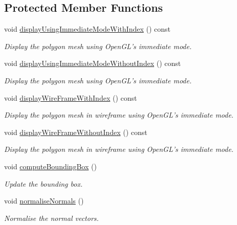 \subsection*{Protected Member Functions}
\begin{DoxyCompactItemize}
\item 
void \hyperlink{class_graphics_1_1_triangle_mesh_a9efdf4756ab73014ae197b1b5979e108}{displayUsingImmediateModeWithIndex} () const 
\begin{DoxyCompactList}\small\item\em Display the polygon mesh using OpenGL's immediate mode. \end{DoxyCompactList}\item 
void \hyperlink{class_graphics_1_1_triangle_mesh_a4843779d6f90b2889de7ba8c346d8321}{displayUsingImmediateModeWithoutIndex} () const 
\begin{DoxyCompactList}\small\item\em Display the polygon mesh using OpenGL's immediate mode. \end{DoxyCompactList}\item 
void \hyperlink{class_graphics_1_1_triangle_mesh_a01836381cac26a3491d919a3bf1ab92c}{displayWireFrameWithIndex} () const 
\begin{DoxyCompactList}\small\item\em Display the polygon mesh in wireframe using OpenGL's immediate mode. \end{DoxyCompactList}\item 
void \hyperlink{class_graphics_1_1_triangle_mesh_a155ce509ff70efecb84d24e22919b9f0}{displayWireFrameWithoutIndex} () const 
\begin{DoxyCompactList}\small\item\em Display the polygon mesh in wireframe using OpenGL's immediate mode. \end{DoxyCompactList}\item 
void \hyperlink{class_graphics_1_1_triangle_mesh_a06709382a9e87d0758fa3bda0268a805}{computeBoundingBox} ()
\begin{DoxyCompactList}\small\item\em Update the bounding box. \end{DoxyCompactList}\item 
void \hyperlink{class_graphics_1_1_triangle_mesh_a66f9f6680f8a6ae76eb290b0dbf7f57e}{normaliseNormals} ()
\begin{DoxyCompactList}\small\item\em Normalise the normal vectors. \end{DoxyCompactList}\item 

\end{DoxyCompactItemize}
